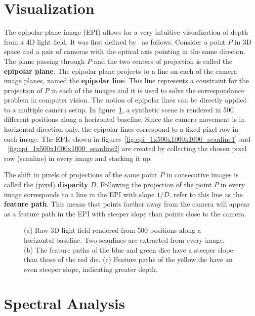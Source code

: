 \section{Visualization}

The epipolar-plane image (EPI) allows for a very intuitive visualization of depth from a 4D light field.
It was first defined by~\cite{EPI} as follows.
Consider a point $P$ in 3D space and a pair of cameras with the optical axis pointing in the same direcion.
The plane passing through $P$ and the two centers of projection is called the \textbf{epipolar plane}.
The epipolar plane projects to a line on each of the camera image planes, named the \textbf{epipolar line}.
This line represents a constraint for the projection of $P$ in each of the images and it is used to solve the correspondance problem in computer vision.
The notion of epipolar lines can be directly applied to a multiple camera setup.
In figure~\ref{fig:epi_example_perspective}, a synthetic scene is rendered in 500 different positions along a horizontal baseline.
Since the camera movement is in horizontal direction only, the epipolar lines correspond to a fixed pixel row in each image.
The EPIs shown in figures~\ref{fig:epi_1x500x1000x1000_scanline1} and ~\ref{fig:epi_1x500x1000x1000_scanline2} are created by collecting the chosen pixel row (scanline) in every image and stacking it up.

The shift in pixels of projections of the same point $P$ in consecutive images is called the (pixel) \textbf{disparity} $D$.
Following the projection of the point $P$ in every image corresponds to a line in the EPI with slope $1 / D$.
\cite{EPI} refer to this line as the \textbf{feature path}.
This means that points farther away from the camera will appear as a feature path in the EPI with steeper slope than points close to the camera.

\begin{figure}[tb]
	\subfigure[]{
		\centering
		
		\label{fig:epi_1x500x1000x1000_overview}
	}
	\hfill
	\subfigure[]{
		\centering
		
		\label{fig:epi_1x500x1000x1000_scanline1}
	}
	\hfill
	\subfigure[]{
		\centering
		
		\label{fig:epi_1x500x1000x1000_scanline2}
	}
	\caption{(a) Raw 3D light field rendered from 500 positions along a horizontal baseline.
				 Two scanlines are extracted from every image. 
			 (b) The feature paths of the blue and green dice have a steeper slope than those of the red die.
			 (c) Feature paths of the yellow die have an even steeper slope, indicating greater depth.}
	\label{fig:epi_example_perspective}
\end{figure}

\section{Spectral Analysis}

